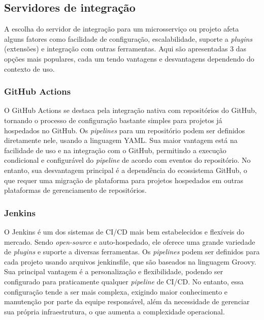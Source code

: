 \subsection{Servidores de integração}
A escolha do servidor de integração para um microsserviço ou projeto afeta alguns fatores como facilidade de configuração, escalabilidade, suporte a \emph{plugins} (extensões) e integração com outras ferramentas. Aqui são apresentadas 3 das opções mais populares, cada um tendo vantagens e desvantagens dependendo do contexto de uso.

\subsubsection*{GitHub Actions}
O GitHub Actions se destaca pela integração nativa com repositórios do GitHub, tornando o processo de configuração bastante simples para projetos já hospedados no GitHub. Os \emph{pipelines} para um repositório podem ser definidos diretamente nele, usando a linguagem YAML. Sua maior vantagem está na facilidade de uso e na integração com o GitHub, permitindo a execução condicional e configurável do \emph{pipeline} de acordo com eventos do repositório. No entanto, sua desvantagem principal é a dependência do ecossistema GitHub, o que requer uma migração de plataforma para projetos hospedados em outras plataformas de gerenciamento de repositórios.

\subsubsection*{Jenkins}
O Jenkins é um dos sistemas de CI/CD mais bem estabelecidos e flexíveis do mercado. Sendo \emph{open-source} e auto-hospedado, ele oferece uma grande variedade de \emph{plugins} e suporte a diversas ferramentas. Os \emph{pipelines} podem ser definidos para cada projeto usando arquivos jenkinsfile, que são baseados na linguagem Groovy. Sua principal vantagem é a personalização e flexibilidade, podendo ser configurado para praticamente qualquer \emph{pipeline} de CI/CD. No entanto, essa configuração tende a ser mais complexa, exigindo maior conhecimento e manutenção por parte da equipe responsável, além da necessidade de gerenciar sua própria infraestrutura, o que aumenta a complexidade operacional.

